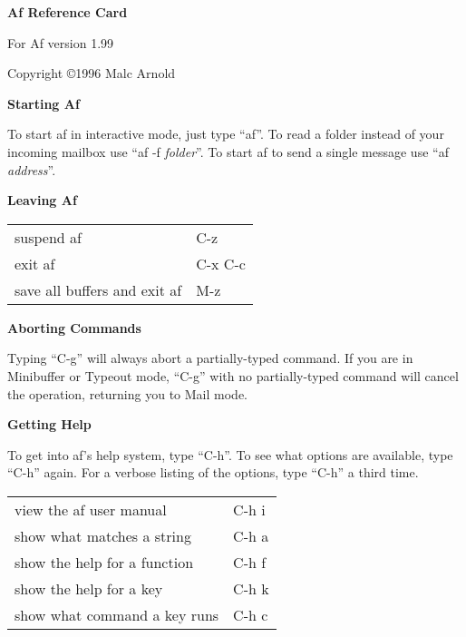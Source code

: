 \documentclass[10pt,a4paper,landscape]{article}
\begin{document}
\begin{multicols}{3}

  \parbox{2.80in}{\begin{center}
      {\huge \textbf{Af Reference Card}}

      {\small {For Af version 1.99}}

      {\small Copyright \copyright 1996 Malc Arnold}
    \end{center}}
  \vfill

  {\large \textbf{Starting Af}}
  \nopagebreak

  \parbox{2.80in}{To start af in interactive mode, just type ``af''.  To
    read a folder instead of your incoming mailbox use ``af -f
    \emph{folder}''.  To start af to send a single message use ``af
    \emph{address}''.}
  \vfill

  {\large \textbf{Leaving Af}}
  \nopagebreak

  \begin{tabular}{p{2.00in}p{0.80in}}
    suspend af & C-z \\
    exit af & C-x C-c \\
    save all buffers and exit af & M-z \\
  \end{tabular}
  \vfill

  {\large \textbf{Aborting Commands}}
  \nopagebreak

  \parbox{2.80in}{Typing ``C-g'' will always abort a partially-typed
    command.  If you are in Minibuffer or Typeout mode, ``C-g'' with no
    partially-typed command will cancel the operation, returning you to
    Mail mode.}
  \vfill

  {\large \textbf{Getting Help}}
  \nopagebreak

  \parbox{2.80in}{To get into af's help system, type ``C-h''.  To see
    what options are available, type ``C-h'' again.  For a verbose
    listing of the options, type ``C-h'' a third time.}
  \nopagebreak

  \begin{tabular}{p{2.00in}p{0.80in}}
    view the af user manual & C-h i \\
    show what matches a string & C-h a \\
    show the help for a function & C-h f \\
    show the help for a key & C-h k \\
    show what command a key runs & C-h c \\
  \end{tabular}
  \vfill


\end{multicols}
\end{document}
